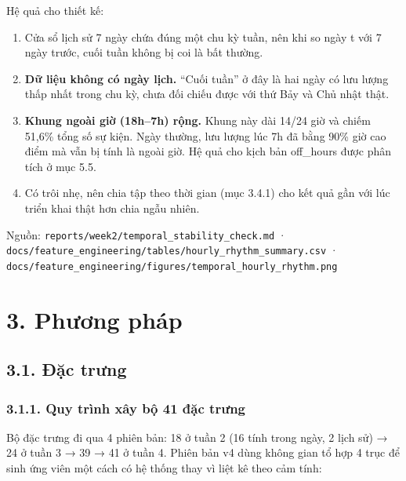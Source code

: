 \documentclass[
  11pt,
]{article}
\providecommand{\tightlist}{%
  \setlength{\itemsep}{0pt}\setlength{\parskip}{0pt}}
\begin{document}
Hệ quả cho thiết kế:

\begin{enumerate}
\def\labelenumi{\arabic{enumi}.}
\tightlist
\item
  Cửa sổ lịch sử 7 ngày chứa đúng một chu kỳ tuần, nên khi so ngày t với
  7 ngày trước, cuối tuần không bị coi là bất thường.
\item
  \textbf{Dữ liệu không có ngày lịch.} ``Cuối tuần'' ở đây là hai ngày
  có lưu lượng thấp nhất trong chu kỳ, chưa đối chiếu được với thứ Bảy
  và Chủ nhật thật.
\item
  \textbf{Khung ngoài giờ (18h--7h) rộng.} Khung này dài 14/24 giờ và
  chiếm 51,6\% tổng số sự kiện. Ngày thường, lưu lượng lúc 7h đã bằng
  90\% giờ cao điểm mà vẫn bị tính là ngoài giờ. Hệ quả cho kịch bản
  off\_\allowbreak{}hours được phân tích ở mục 5.5.
\item
  Có trôi nhẹ, nên chia tập theo thời gian (mục 3.4.1) cho kết quả gần
  với lúc triển khai thật hơn chia ngẫu nhiên.
\end{enumerate}

Nguồn:
\texttt{reports/\allowbreak{}week2/\allowbreak{}temporal\_\allowbreak{}stability\_\allowbreak{}check.\allowbreak{}md}
·
\texttt{docs/\allowbreak{}feature\_\allowbreak{}engineering/\allowbreak{}tables/\allowbreak{}hourly\_\allowbreak{}rhythm\_\allowbreak{}summary.\allowbreak{}csv}
·
\texttt{docs/\allowbreak{}feature\_\allowbreak{}engineering/\allowbreak{}figures/\allowbreak{}temporal\_\allowbreak{}hourly\_\allowbreak{}rhythm.\allowbreak{}png}

\hypertarget{phux1b0ux1a1ng-phuxe1p}{%
\section{3. Phương pháp}\label{phux1b0ux1a1ng-phuxe1p}}

\hypertarget{ux111ux1eb7c-trux1b0ng}{%
\subsection{3.1. Đặc trưng}\label{ux111ux1eb7c-trux1b0ng}}

\hypertarget{quy-truxecnh-xuxe2y-bux1ed9-41-ux111ux1eb7c-trux1b0ng}{%
\subsubsection{3.1.1. Quy trình xây bộ 41 đặc
trưng}\label{quy-truxecnh-xuxe2y-bux1ed9-41-ux111ux1eb7c-trux1b0ng}}

Bộ đặc trưng đi qua 4 phiên bản: 18 ở tuần 2 (16 tính trong ngày, 2 lịch
sử) → 24 ở tuần 3 → 39 → 41 ở tuần 4. Phiên bản v4 dùng không gian tổ
hợp 4 trục để sinh ứng viên một cách có hệ thống thay vì liệt kê theo
cảm tính:
\end{document}
